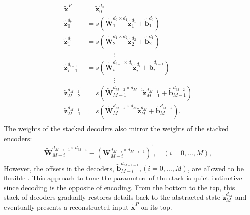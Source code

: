 \documentclass[11pt]{article}
\newcommand{\vecEC}[1]{\boldsymbol{#1}}
\newcommand{\vecDC}[1]{\boldsymbol{\tilde{#1}}}
\newcommand{\WEC}{\vecEC{W}}                   %
\newcommand{\WEI}[3]{\WEC_{#1}^{d_{#2} \times d_{#3}}} %
\newcommand{\WDC}{\vecDC{W}}                   %
\newcommand{\WDI}[3]{\WDC_{#1}^{d_{#2} \times d_{#3}}} %
\newcommand{\bDC}{\vecDC{b}}    %
\newcommand{\bDI}[2]{\bDC_{#1}^{d_{#2}}} %
\newcommand{\xDC}{\vecDC{x}}
\newcommand{\zDC}{\vecDC{z}}
\newcommand{\zDI}[2]{\zDC_{#1}^{d_{#2}}}
\begin{document}
\begin{equation} \label{eq:SD}
  \begin{split}
    \xDC^P &= \zDI{0}{0} \\
    \zDI{0  }{0  } &= s(\WDI{1  }{0  }{1  } \zDI{1  }{1  } + \bDI{1  }{0  }) \\
    \zDI{1  }{1  } &= s(\WDI{2  }{1  }{2  } \zDI{2  }{2  } + \bDI{2  }{1  }) \\
    & \quad \quad \quad \quad \vdots \\
    \zDI{i-1}{i-1} &= s(\WDI{i  }{i-1}{i  } \zDI{i  }{i  } + \bDI{i  }{i-1}) \\
    & \quad \quad \quad \quad \vdots \\
    \zDI{M-2}{M-2} &= s(\WDI{M-1}{M-2}{M-1} \zDI{M-1}{M-1} + \bDI{M-1}{M-2}) \\
    \zDI{M-1}{M-1} &= s(\WDI{M  }{M-1}{M  } \zDI{M  }{M  } + \bDI{M  }{M-1}). \\
  \end{split}
\end{equation}
The weights of the stacked decoders also mirror the weights of the stacked encoders:
\begin{align}
  \WDI{M-i}{M-i-1}{M-i} \equiv {(\WEI{M-i}{M-i}{M-i-1})}^\prime, \quad (i=0, \dots, M),
\end{align}
However, the offsets in the decoders, $\bDI{M-i}{M-i-1}, (i=0, \dots, M)$, are allowed to be flexible \citep{DL:SDA1}. This approach to tune the parameters of the stack is quiet instinctive since decoding is the opposite of encoding. From the bottom to the top, this stack of decoders gradually restores details back to the abstracted state $\zDI{M}{M}$ and eventually presents a reconstructed input $\xDC^P$ on its top.
\end{document}
